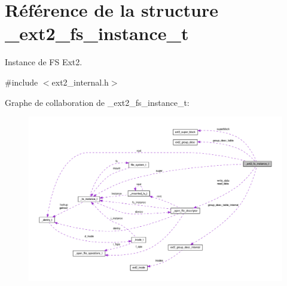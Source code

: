 \hypertarget{struct__ext2__fs__instance__t}{\section{Référence de la structure \-\_\-ext2\-\_\-fs\-\_\-instance\-\_\-t}
\label{struct__ext2__fs__instance__t}
}


Instance de F\-S Ext2.  




{\ttfamily \#include $<$ext2\-\_\-internal.\-h$>$}



Graphe de collaboration de \-\_\-ext2\-\_\-fs\-\_\-instance\-\_\-t\-:
\nopagebreak
\begin{figure}[H]
\begin{center}
\leavevmode
\includegraphics[width=350pt]{struct__ext2__fs__instance__t__coll__graph}
\end{center}
\end{figure}
